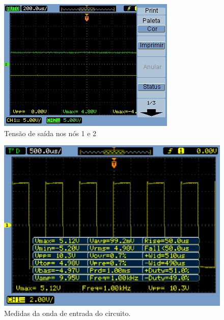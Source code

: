 \documentclass[a4paper]{article} %
\begin{document}
\begin{figure}[h!]
\begin{centering}
\includegraphics[scale=0.50]{Imagens/3.4duplicador_tensao/423} \caption{Tensão de saída nos nós 1 e 2 \label{fig:dob-no12}}
\par\end{centering}
\end{figure}


\begin{figure}[h!]
\begin{centering}
\par\end{centering}
\end{figure}


\begin{figure}[h!]
\begin{centering}
\includegraphics[scale=0.50]{Imagens/3.4duplicador_tensao/Vinmedidas}
\par\end{centering}
\caption{ Medidas da onda de entrada do circuito. \label{fig:dob}}
\end{figure}
\end{document}
